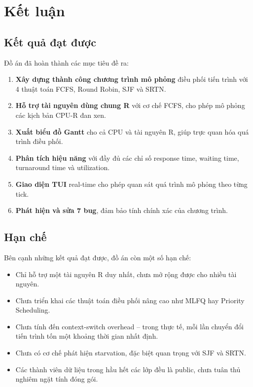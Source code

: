 \chapter{Kết luận}

\section{Kết quả đạt được}

Đồ án đã hoàn thành các mục tiêu đề ra:

\begin{enumerate}
    \item \textbf{Xây dựng thành công chương trình mô phỏng} điều phối tiến trình với 4 thuật toán FCFS, Round Robin, SJF và SRTN.
    \item \textbf{Hỗ trợ tài nguyên dùng chung R} với cơ chế FCFS, cho phép mô phỏng các kịch bản CPU-R đan xen.
    \item \textbf{Xuất biểu đồ Gantt} cho cả CPU và tài nguyên R, giúp trực quan hóa quá trình điều phối.
    \item \textbf{Phân tích hiệu năng} với đầy đủ các chỉ số response time, waiting time, turnaround time và utilization.
    \item \textbf{Giao diện TUI} real-time cho phép quan sát quá trình mô phỏng theo từng tick.
    \item \textbf{Phát hiện và sửa 7 bug}, đảm bảo tính chính xác của chương trình.
\end{enumerate}

\section{Hạn chế}

Bên cạnh những kết quả đạt được, đồ án còn một số hạn chế:

\begin{itemize}
    \item Chỉ hỗ trợ một tài nguyên R duy nhất, chưa mở rộng được cho nhiều tài nguyên.
    \item Chưa triển khai các thuật toán điều phối nâng cao như MLFQ hay Priority Scheduling.
    \item Chưa tính đến context-switch overhead -- trong thực tế, mỗi lần chuyển đổi tiến trình tốn một khoảng thời gian nhất định.
    \item Chưa có cơ chế phát hiện starvation, đặc biệt quan trọng với SJF và SRTN.
    \item Các thành viên dữ liệu trong hầu hết các lớp đều là public, chưa tuân thủ nghiêm ngặt tính đóng gói.
\end{itemize}


